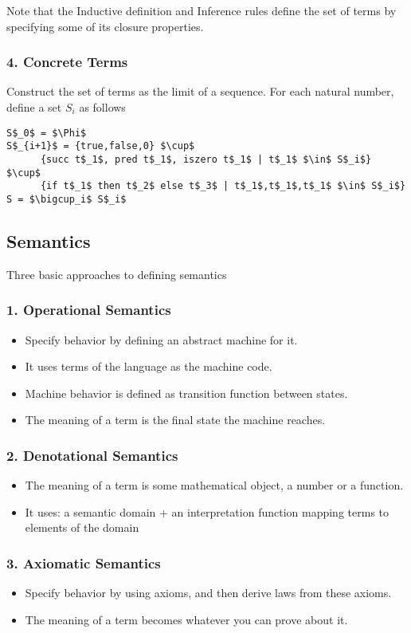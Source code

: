 \documentclass[]{article}
\begin{document}
Note that the Inductive definition and Inference rules define the set of terms by specifying some of its closure properties. 

\subsubsection*{4. Concrete Terms}
Construct the set of terms as the limit of a sequence. For each natural number, define a set $S_i$ as follows 
\begin{lstlisting}[mathescape=true]
S$_0$ = $\Phi$
S$_{i+1}$ = {true,false,0} $\cup$
      {succ t$_1$, pred t$_1$, iszero t$_1$ | t$_1$ $\in$ S$_i$} $\cup$
      {if t$_1$ then t$_2$ else t$_3$ | t$_1$,t$_1$,t$_1$ $\in$ S$_i$}
S = $\bigcup_i$ S$_i$
\end{lstlisting} 

\subsection*{Semantics}
Three basic approaches to defining semantics 
\subsubsection*{1. Operational Semantics}
\begin{itemize}
	\item Specify behavior by defining an abstract machine for it. 
	\item It uses terms of the language as the machine code.  
	\item Machine behavior is defined as transition function between states. 
	\item The meaning of a term is the final state the machine reaches. 
\end{itemize}

\subsubsection*{2. Denotational Semantics}
\begin{itemize}
	\item The meaning of a term is some mathematical object, a number or a function. 
	\item It uses: a semantic domain + an interpretation function mapping terms to elements of the domain 
\end{itemize}

\subsubsection*{3.	Axiomatic Semantics}
\begin{itemize}
	\item Specify behavior by using axioms, and then derive laws from these axioms. 
	\item The meaning of a term becomes whatever you can prove about it. 
\end{itemize}
\end{document}
